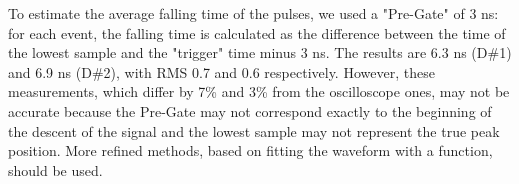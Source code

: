 \documentclass[a4paper]{article}
\begin{document}



To estimate the average falling time of the pulses, we used a "Pre-Gate" of 3 ns: for each event, the falling time is calculated as the difference between the time of the lowest sample and the "trigger" time minus 3 ns. 
The results are 6.3 ns (D\#1) and 6.9 ns (D\#2), with RMS 0.7 and 0.6 respectively.
However, these measurements, which differ by 7\% and 3\% from the oscilloscope ones, may not be accurate because the Pre-Gate may not correspond exactly to the beginning of the descent of the signal and the lowest sample may not represent the true peak position. 
More refined methods, based on fitting the waveform with a function, should be used.
\end{document}
